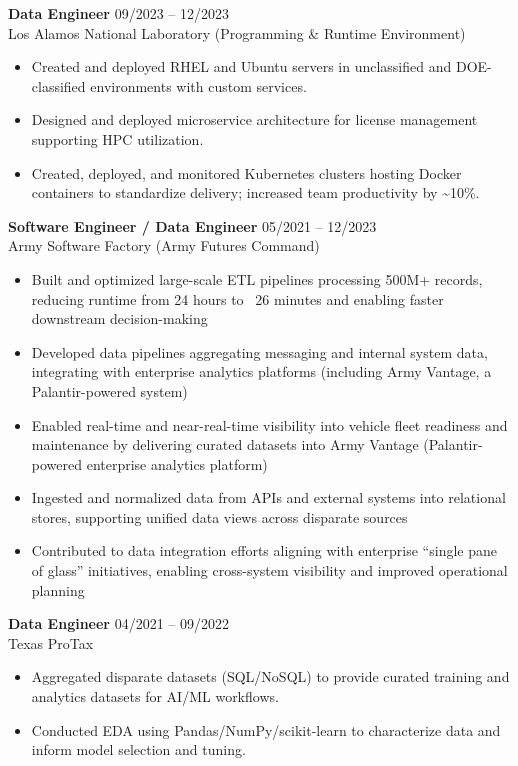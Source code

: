 \textbf{Data Engineer} \hfill 09/2023 -- 12/2023 \\
Los Alamos National Laboratory (Programming \& Runtime Environment)
\begin{itemize}
  \item Created and deployed RHEL and Ubuntu servers in unclassified and DOE-classified environments with custom services.
  \item Designed and deployed microservice architecture for license management supporting HPC utilization.
  \item Created, deployed, and monitored Kubernetes clusters hosting Docker containers to standardize delivery; increased team productivity by \textasciitilde10\%.
\end{itemize}
\vspace{0.3em}

\textbf{Software Engineer / Data Engineer} \hfill 05/2021 -- 12/2023 \\
Army Software Factory (Army Futures Command)
\begin{itemize}
  \item Built and optimized large-scale ETL pipelines processing 500M+ records, reducing runtime from 24 hours to ~26 minutes and enabling faster downstream decision-making  
  \item Developed data pipelines aggregating messaging and internal system data, integrating with enterprise analytics platforms (including Army Vantage, a Palantir-powered system) 
  \item Enabled real-time and near-real-time visibility into vehicle fleet readiness and maintenance by delivering curated datasets into Army Vantage (Palantir-powered enterprise analytics platform)
  \item Ingested and normalized data from APIs and external systems into relational stores, supporting unified data views across disparate sources
  \item Contributed to data integration efforts aligning with enterprise “single pane of glass” initiatives, enabling cross-system visibility and improved operational planning 
\end{itemize}
\vspace{0.3em}

\textbf{Data Engineer} \hfill 04/2021 -- 09/2022 \\
Texas ProTax
\begin{itemize}
  \item Aggregated disparate datasets (SQL/NoSQL) to provide curated training and analytics datasets for AI/ML workflows.
  \item Conducted EDA using Pandas/NumPy/scikit-learn to characterize data and inform model selection and tuning.
\end{itemize}
\vspace{0.3em}

